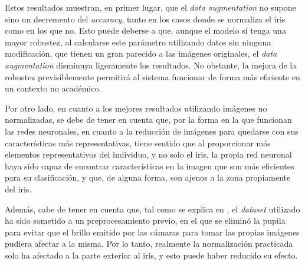 Estos resultados muestran, en primer lugar, que el \textit{data augmentation} no supone sino un decremento del \textit{accuracy}, tanto en los casos donde se normaliza el iris
como en los que no. Esto puede deberse a que, aunque el modelo sí tenga una mayor robustez, al calcularse este parámetro utilizando datos sin ninguna modificación, que 
tienen un gran parecido a las imágenes originales, el \textit{data augmentation} disminuya ligeramente los resultados. No obstante, la mejora de la robustez previsiblemente
permitirá al sistema funcionar de forma más eficiente en un contexto no académico.

Por otro lado, en cuanto a los mejores resultados utilizando imágenes no normalizadas, se debe de tener en cuenta que, por la forma en la que funcionan las redes neuronales,
en cuanto a la reducción de imágenes para quedarse con sus características más representativas, tiene sentido que al proporcionar más elementos representativos del individuo,
y no solo el iris, la propia red neuronal haya sido capaz de encontrar características en la imagen que son más eficientes para su clasificación, y que, de alguna forma, son
ajenos a la zona propiamente del iris.

Además, cabe de tener en cuenta que, tal como se explica en , el \textit{dataset} utilizado ha sido sometido a un preprocesamiento previo, en el que se eliminó la pupila 
para evitar que el brillo emitido por las cámaras para tomar las propias imágenes pudiera afectar a la misma. Por lo tanto, realmente la normalización practicada solo ha afectado a la 
parte exterior al iris, y esto puede haber reducido su efecto.

